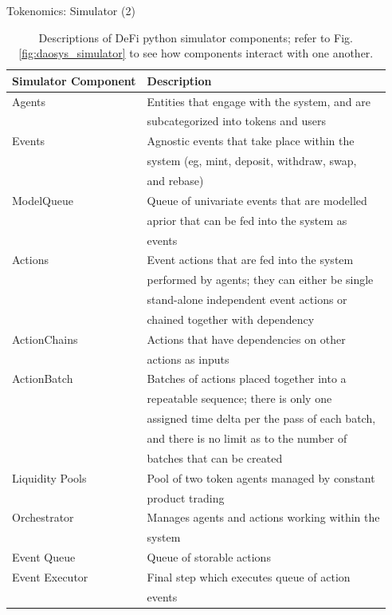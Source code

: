 \documentclass[10pt,xcolor=svgnames]{beamer} %
\begin{document}
\begin{frame}{Tokenomics: Simulator (2)}

\begin{table}[h]
\tiny
\centering
\begin{tabular}{ |l|l| } 
\hline
 \textbf{Simulator Component} & \textbf{Description} \\
\hline
Agents          & Entities that engage with the system, and are  \\
                & subcategorized into tokens and users \\
Events          & Agnostic events that take place within the \\ 
				& system (eg, mint, deposit, withdraw, swap, \\
				& and rebase) \\
ModelQueue      & Queue of univariate events that are modelled \\
				& aprior that can be fed into the system as \\
				& events\\
Actions         & Event actions that are fed into the system \\
				& performed by agents; they can either be single \\
				& stand-alone independent event actions or \\
				& chained together with dependency \\
ActionChains    & Actions that have dependencies on other \\
				& actions as inputs \\				
ActionBatch     & Batches of actions placed together into a \\
				& repeatable sequence; there is only one \\
				& assigned time delta per the pass of each batch, \\
				& and there is no limit as to the number of \\
				& batches that can be created \\
Liquidity Pools & Pool of two token agents managed by constant \\ 
				& product trading \\
Orchestrator    & Manages agents and actions working within the \\ 
				& system \\
Event Queue     & Queue of storable actions \\
Event Executor  & Final step which executes queue of action \\
				& events \\
\hline
\end{tabular}
\caption{Descriptions of DeFi python simulator components; refer to Fig. \ref{fig:daosys_simulator} to see how components interact with one another.}
\label{table:simulator_components}
\end{table}

\end{frame}
\end{document}
